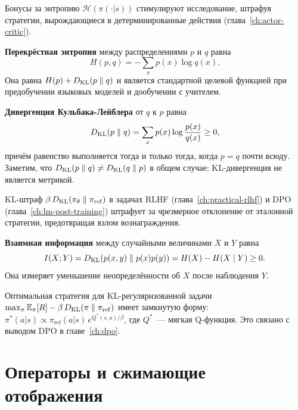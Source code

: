 Бонусы за энтропию $\mathcal{H}(\pi(\cdot|s))$ стимулируют исследование, штрафуя стратегии, вырождающиеся в детерминированные действия (глава~\ref{ch:actor-critic}).

\begin{definition}
\label{def:cross-entropy}
\textbf{Перекрёстная энтропия} между распределениями $p$ и $q$ равна
\[
    H(p,q) = -\sum_x p(x)\log q(x).
\]
Она равна $H(p) + D_{\mathrm{KL}}\!\left(p\;\|\;q\right)$ и является стандартной целевой функцией при предобучении языковых моделей и дообучении с учителем.
\end{definition}

\begin{definition}[KL-дивергенция]
\label{def:kl}
\textbf{Дивергенция Кульбака-Лейблера} от $q$ к $p$ равна
\[
    D_{\mathrm{KL}}\!\left(p\;\|\;q\right) = \sum_x p(x)\log\frac{p(x)}{q(x)} \geq 0,
\]
причём равенство выполняется тогда и только тогда, когда $p = q$ почти всюду. Заметим, что $D_{\mathrm{KL}}\!\left(p\;\|\;q\right) \neq D_{\mathrm{KL}}\!\left(q\;\|\;p\right)$ в общем случае; KL-дивергенция не является метрикой.
\end{definition}

KL-штраф $\beta\,D_{\mathrm{KL}}\!\left(\pi_\theta\;\|\;\pi_\mathrm{ref}\right)$ в задачах RLHF (глава~\ref{ch:practical-rlhf}) и DPO (глава~\ref{ch:lm-post-training}) штрафует за чрезмерное отклонение от эталонной стратегии, предотвращая взлом вознаграждения.

\begin{definition}
\label{def:mutual-info}
\textbf{Взаимная информация} между случайными величинами $X$ и $Y$ равна
\[
    I(X;Y) = D_{\mathrm{KL}}\!\left(p(x,y)\;\|\;p(x)p(y)\right)
            = H(X) - H(X \mid Y) \geq 0.
\]
Она измеряет уменьшение неопределённости об $X$ после наблюдения $Y$.
\end{definition}

\begin{example}[RL с KL-регуляризацией]
Оптимальная стратегия для KL-регуляризованной задачи $\max_\pi \operatorname{\mathbb{E}}_\pi[R] - \beta\,D_{\mathrm{KL}}\!\left(\pi\;\|\;\pi_\mathrm{ref}\right)$ имеет замкнутую форму: $\pi^*(a|s) \propto \pi_\mathrm{ref}(a|s)\, e^{Q^*(s,a)/\beta}$, где $Q^*$~--- мягкая Q-функция. Это связано с выводом DPO в главе~\ref{ch:dpo}.
\end{example}

\section{Операторы и сжимающие отображения}
\label{app:operators}

